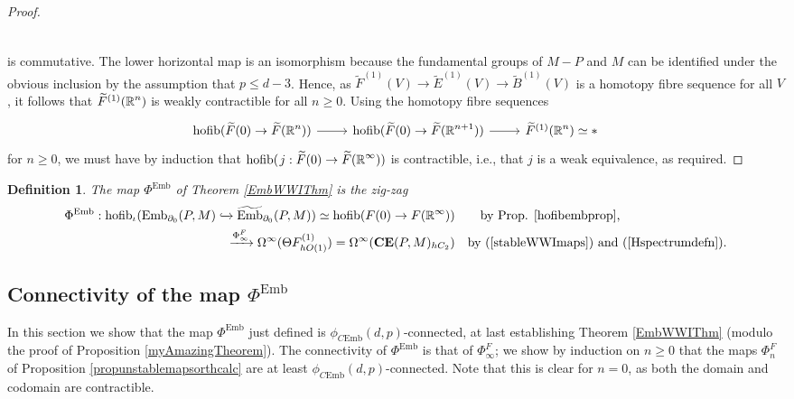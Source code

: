 \documentclass[a4paper, oneside]{amsart}
\newcommand{\emb}{\operatorname{Emb}}
\newcommand{\bemb}{\widetilde{\operatorname{Emb}}}
\newcommand{\hofib}{\operatorname{hofib}}
\newcommand{\cemb}{C\mathrm{Emb}}
\newcommand{\1}{\mathds{1}}
\newtheorem{defn}[thm]{Definition}
\theoremstyle{remark}
\theoremstyle{definition}
\newcommand{\R}{{\scaleobj{0.97}{\mathbb{R}}}}
\newcommand{\CEsp}{\mathbf{CE}}
\numberwithin{equation}{section}
\begin{document}
\begin{proof}
$$\begin{tikzcd}
\end{tikzcd}
$$
is commutative. The lower horizontal map is an isomorphism because the fundamental groups of $M-P$ and $M$ can be identified under the obvious inclusion by the assumption that $p\leq d-3$. Hence, as $\widetilde{F}^{(1)}(V)\to \widetilde{E}^{(1)}(V)\to \widetilde{B}^{(1)}(V)$ is a homotopy fibre sequence for all $V$, it follows that $\widetilde{F}^{(1)}(\R^n)$ is weakly contractible for all $n\geq 0$. Using the homotopy fibre sequences
$$
\begin{tikzcd}
     \hofib(\widetilde{F}(0)\to\widetilde F(\R^n))\rar & \hofib(\widetilde{F}(0)\to\widetilde F(\R^{n+1}))\rar & \widetilde{F}^{(1)}(\R^n)\simeq *
\end{tikzcd}
$$
for $n\geq 0$, we must have by induction that $\hofib(\hspace{1pt}j:\widetilde{F}(0)\to\widetilde F(\R^\infty))$ is contractible, i.e., that $j$ is a weak equivalence, as required.
\end{proof}


\begin{defn}\label{Phiembdefn}
    The map $\Phi^{\emb}$ of Theorem \ref{EmbWWIThm} is the zig-zag 
\begin{alignat*}{1}
\Phi^{\emb}: \hofib_\iota(\emb_{\partial_0}(P,M)\xhookrightarrow{}\bemb_{\partial_0}(P,M))\simeq \hofib(F(0)\to F(\R^\infty)) & \qquad
\text{by Prop. \ref{hofibembprop},}\\          
\xrightarrow{\Phi_\infty^F}\Omega^\infty(\Theta F^{(1)}_{hO(1)})=\Omega^\infty(\CEsp(P,M)_{hC_2}) &\quad\text{by (\ref{stableWWImaps}) and (\ref{Hspectrumdefn}).}
\end{alignat*}
\end{defn}



\subsection{Connectivity of the map $\Phi^{\emb}$}\label{connectivitysection} In this section we show that the map $\Phi^{\emb}$ just defined is $\phi_{\cemb}(d,p)$-connected, at last establishing Theorem \ref{EmbWWIThm} (modulo the proof of Proposition \ref{myAmazingTheorem}). The connectivity of $\Phi^{\emb}$ is that of $\Phi^{F}_\infty$; we show by induction on $n\geq 0$ that the maps $\Phi^{F}_n$ of Proposition \ref{propunstablemapsorthcalc} are at least $\phi_{\cemb}(d,p)$-connected. Note that this is clear for $n=0$, as both the domain and codomain are contractible. 
\end{document}
